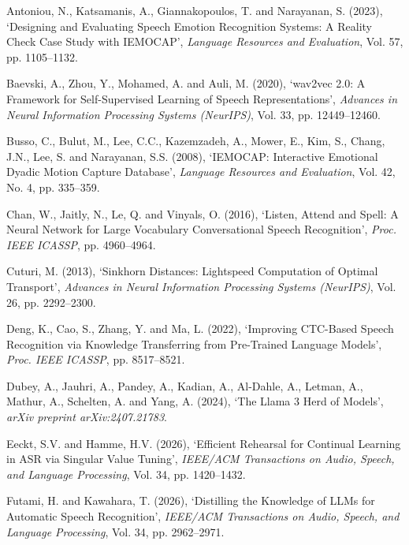 \documentclass[12pt,a4paper]{report}
\begin{document}
\begin{singlespace}
\noindent Antoniou, N., Katsamanis, A., Giannakopoulos, T. and Narayanan, S. (2023), `Designing and Evaluating Speech Emotion Recognition Systems: A Reality Check Case Study with IEMOCAP', \textit{Language Resources and Evaluation}, Vol. 57, pp. 1105--1132.

\vspace{0.4cm}
\noindent Baevski, A., Zhou, Y., Mohamed, A. and Auli, M. (2020), `wav2vec 2.0: A Framework for Self-Supervised Learning of Speech Representations', \textit{Advances in Neural Information Processing Systems (NeurIPS)}, Vol. 33, pp. 12449--12460.

\vspace{0.4cm}
\noindent Busso, C., Bulut, M., Lee, C.C., Kazemzadeh, A., Mower, E., Kim, S., Chang, J.N., Lee, S. and Narayanan, S.S. (2008), `IEMOCAP: Interactive Emotional Dyadic Motion Capture Database', \textit{Language Resources and Evaluation}, Vol. 42, No. 4, pp. 335--359.

\vspace{0.4cm}
\noindent Chan, W., Jaitly, N., Le, Q. and Vinyals, O. (2016), `Listen, Attend and Spell: A Neural Network for Large Vocabulary Conversational Speech Recognition', \textit{Proc. IEEE ICASSP}, pp. 4960--4964.

\vspace{0.4cm}
\noindent Cuturi, M. (2013), `Sinkhorn Distances: Lightspeed Computation of Optimal Transport', \textit{Advances in Neural Information Processing Systems (NeurIPS)}, Vol. 26, pp. 2292--2300.

\vspace{0.4cm}
\noindent Deng, K., Cao, S., Zhang, Y. and Ma, L. (2022), `Improving CTC-Based Speech Recognition via Knowledge Transferring from Pre-Trained Language Models', \textit{Proc. IEEE ICASSP}, pp. 8517--8521.

\vspace{0.4cm}
\noindent Dubey, A., Jauhri, A., Pandey, A., Kadian, A., Al-Dahle, A., Letman, A., Mathur, A., Schelten, A. and Yang, A. (2024), `The Llama 3 Herd of Models', \textit{arXiv preprint arXiv:2407.21783}.

\vspace{0.4cm}
\noindent Eeckt, S.V. and Hamme, H.V. (2026), `Efficient Rehearsal for Continual Learning in ASR via Singular Value Tuning', \textit{IEEE/ACM Transactions on Audio, Speech, and Language Processing}, Vol. 34, pp. 1420--1432.

\vspace{0.4cm}
\noindent Futami, H. and Kawahara, T. (2026), `Distilling the Knowledge of LLMs for Automatic Speech Recognition', \textit{IEEE/ACM Transactions on Audio, Speech, and Language Processing}, Vol. 34, pp. 2962--2971.


\end{singlespace}
\end{document}
